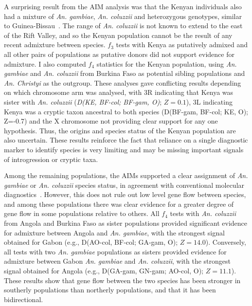 \begin{refsection}
A surprising result from the AIM analysis was that the Kenyan individuals also had a mixture of \textit{An. gambiae}, \textit{An. coluzzii} and heterozygous genotypes, similar to Guinea-Bissau~\parencite{Ag1000G2017}.
%
The range of \textit{An. coluzzii} is not known to extend to the east of the Rift Valley, and so the Kenyan population cannot be the result of any recent admixture between species.
%
$f_3$ tests with Kenya as putatively admixed and all other pairs of populations as putative donors did not support evidence for admixture.
%
I also computed $f_4$ statistics for the Kenyan population, using \textit{An. gambiae} and \textit{An. coluzzii} from Burkina Faso as potential sibling populations and \textit{An. Christyi} as the outgroup.
%
These analyses gave conflicting results depending on which chromosome arm was analysed, with 3R indicating that Kenya was sister with \textit{An. coluzzii} (\textit{D(KE, BF-col; BF-gam, O)}; $Z=0.1$), 3L indicating Kenya was a cryptic taxon ancestral to both species (D(BF-gam, BF-col; KE, O); Z=-0.7) and the X chromosome not providing clear support for any one hypothesis.
%
Thus, the origins and species status of the Kenyan population are also uncertain.
%
These results reinforce the fact that reliance on a single diagnostic marker to identify species is very limiting and may be missing important signals of introgression or cryptic taxa.


Among the remaining populations, the AIMs supported a clear assignment of \textit{An. gambiae} or \textit{An. coluzzii} species status, in agreement with conventional molecular diagnostics~\parencite{Ag1000G2017}.
%
However, this does not rule out low level gene flow between species, and among these populations there was clear evidence for a greater degree of gene flow in some populations relative to others.
%
All $f_4$ tests with \textit{An. coluzzii} from Angola and Burkina Faso as sister populations provided significant evidence for admixture between Angola and \textit{An. gambiae}, with the strongest signal obtained for Gabon (e.g., D(AO-col, BF-col; GA-gam, O); $Z=14.0$).
%
Conversely, all tests with two \textit{An. gambiae} populations as sisters provided evidence for admixture between Gabon \textit{An. gambiae} and \textit{An. coluzzii}, with the strongest signal obtained for Angola (e.g., D(GA-gam, GN-gam; AO-col, O); $Z=11.1$).
%
These results show that gene flow between the two species has been stronger in southerly populations than northerly populations, and that it has been bidirectional.



\end{refsection}
